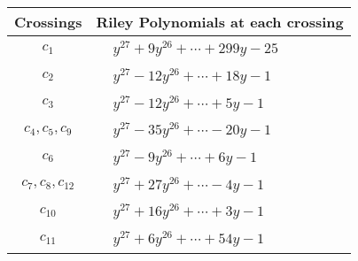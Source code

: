 \documentclass[1p]{elsarticle_modified}
\theoremstyle{definition}
\begin{document}
\begin{tabular}{m{50pt}|m{274pt}}
Crossings & \hspace{64pt}Riley Polynomials at each crossing \\
\hline $$\begin{aligned}c_{1}\end{aligned}$$&$\begin{aligned}
&y^{27}+9 y^{26}+\cdots+299 y-25
\end{aligned}$\\
\hline $$\begin{aligned}c_{2}\end{aligned}$$&$\begin{aligned}
&y^{27}-12 y^{26}+\cdots+18 y-1
\end{aligned}$\\
\hline $$\begin{aligned}c_{3}\end{aligned}$$&$\begin{aligned}
&y^{27}-12 y^{26}+\cdots+5 y-1
\end{aligned}$\\
\hline $$\begin{aligned}c_{4},c_{5},c_{9}\end{aligned}$$&$\begin{aligned}
&y^{27}-35 y^{26}+\cdots-20 y-1
\end{aligned}$\\
\hline $$\begin{aligned}c_{6}\end{aligned}$$&$\begin{aligned}
&y^{27}-9 y^{26}+\cdots+6 y-1
\end{aligned}$\\
\hline $$\begin{aligned}c_{7},c_{8},c_{12}\end{aligned}$$&$\begin{aligned}
&y^{27}+27 y^{26}+\cdots-4 y-1
\end{aligned}$\\
\hline $$\begin{aligned}c_{10}\end{aligned}$$&$\begin{aligned}
&y^{27}+16 y^{26}+\cdots+3 y-1
\end{aligned}$\\
\hline $$\begin{aligned}c_{11}\end{aligned}$$&$\begin{aligned}
&y^{27}+6 y^{26}+\cdots+54 y-1
\end{aligned}$\\
\hline
\end{tabular}\\~\\
\end{document}
